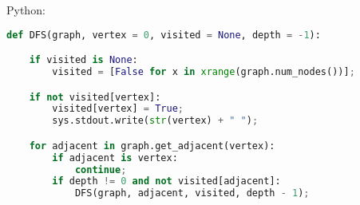 Python:
\begin{lstlisting}[language=Python]
def DFS(graph, vertex = 0, visited = None, depth = -1):

    if visited is None:
        visited = [False for x in xrange(graph.num_nodes())];

    if not visited[vertex]:
        visited[vertex] = True;
        sys.stdout.write(str(vertex) + " ");

    for adjacent in graph.get_adjacent(vertex):
        if adjacent is vertex:
            continue;
        if depth != 0 and not visited[adjacent]:
            DFS(graph, adjacent, visited, depth - 1);
\end{lstlisting}
